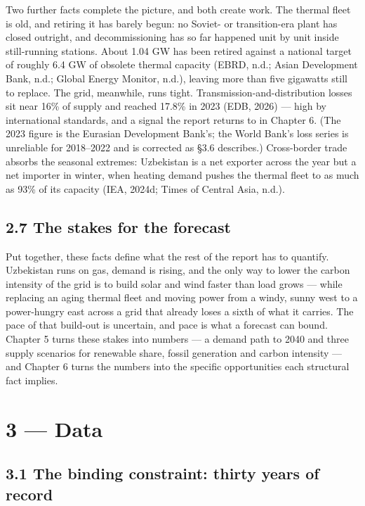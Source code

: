 \documentclass[10pt,twocolumn]{article}
\begin{document}
Two further facts complete the picture, and both create work. The thermal fleet is old, and retiring it has barely begun: no Soviet- or transition-era plant has closed outright, and decommissioning has so far happened unit by unit inside still-running stations. About 1.04 GW has been retired against a national target of roughly 6.4 GW of obsolete thermal capacity (EBRD, n.d.; Asian Development Bank, n.d.; Global Energy Monitor, n.d.), leaving more than five gigawatts still to replace. The grid, meanwhile, runs tight. Transmission-and-distribution losses sit near 16\% of supply and reached 17.8\% in 2023 (EDB, 2026) --- high by international standards, and a signal the report returns to in Chapter 6. (The 2023 figure is the Eurasian Development Bank's; the World Bank's loss series is unreliable for 2018--2022 and is corrected as \S{}3.6 describes.) Cross-border trade absorbs the seasonal extremes: Uzbekistan is a net exporter across the year but a net importer in winter, when heating demand pushes the thermal fleet to as much as 93\% of its capacity (IEA, 2024d; Times of Central Asia, n.d.).

\subsection*{2.7 The stakes for the forecast}

Put together, these facts define what the rest of the report has to quantify. Uzbekistan runs on gas, demand is rising, and the only way to lower the carbon intensity of the grid is to build solar and wind faster than load grows --- while replacing an aging thermal fleet and moving power from a windy, sunny west to a power-hungry east across a grid that already loses a sixth of what it carries. The pace of that build-out is uncertain, and pace is what a forecast can bound. Chapter 5 turns these stakes into numbers --- a demand path to 2040 and three supply scenarios for renewable share, fossil generation and carbon intensity --- and Chapter 6 turns the numbers into the specific opportunities each structural fact implies.

\section*{3 --- Data}

\subsection*{3.1 The binding constraint: thirty years of record}
\end{document}
